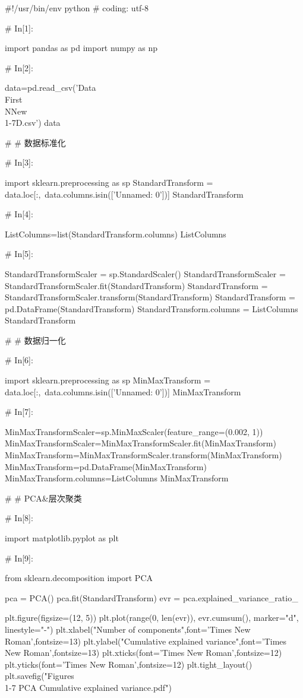 \documentclass{MathorCupModeling}
\begin{document}
\begin{python}
#!/usr/bin/env python
# coding: utf-8

# In[1]:


import pandas as pd
import numpy as np


# In[2]:


data=pd.read_csv('Data\\First\\NNew\\1-7D.csv')
data


# # 数据标准化

# In[3]:


import sklearn.preprocessing as sp
StandardTransform = data.loc[:,~data.columns.isin(['Unnamed: 0'])]
StandardTransform


# In[4]:


ListColumns=list(StandardTransform.columns)
ListColumns


# In[5]:


StandardTransformScaler = sp.StandardScaler()
StandardTransformScaler = StandardTransformScaler.fit(StandardTransform)
StandardTransform = StandardTransformScaler.transform(StandardTransform)
StandardTransform = pd.DataFrame(StandardTransform)
StandardTransform.columns = ListColumns
StandardTransform


# # 数据归一化

# In[6]:


import sklearn.preprocessing as sp
MinMaxTransform = data.loc[:,~data.columns.isin(['Unnamed: 0'])]
MinMaxTransform


# In[7]:


MinMaxTransformScaler=sp.MinMaxScaler(feature_range=(0.002, 1))
MinMaxTransformScaler=MinMaxTransformScaler.fit(MinMaxTransform)
MinMaxTransform=MinMaxTransformScaler.transform(MinMaxTransform)
MinMaxTransform=pd.DataFrame(MinMaxTransform)
MinMaxTransform.columns=ListColumns
MinMaxTransform


# # PCA&层次聚类

# In[8]:


import matplotlib.pyplot as plt


# In[9]:


from sklearn.decomposition import PCA

pca = PCA()
pca.fit(StandardTransform)
evr = pca.explained_variance_ratio_

plt.figure(figsize=(12, 5))
plt.plot(range(0, len(evr)), evr.cumsum(), marker="d", linestyle="-")
plt.xlabel("Number of components",font='Times New Roman',fontsize=13)
plt.ylabel("Cumulative explained variance",font='Times New Roman',fontsize=13)
plt.xticks(font='Times New Roman',fontsize=12)
plt.yticks(font='Times New Roman',fontsize=12)
plt.tight_layout()
plt.savefig("Figures\\1-7 PCA Cumulative explained variance.pdf")



\end{python}
\end{document}
